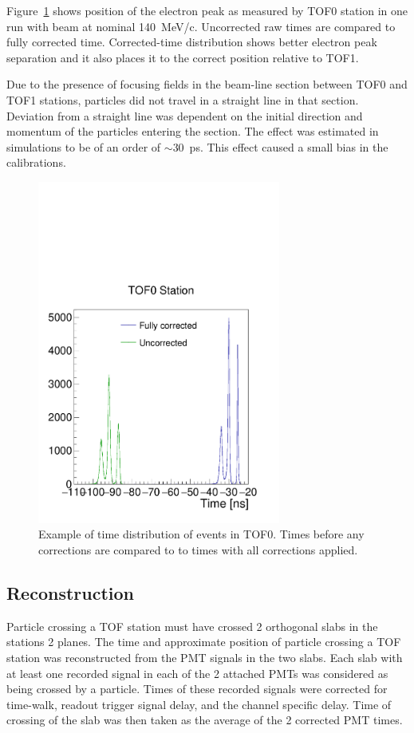 Figure~\ref{fig:tof0times} shows position of the electron peak as
measured by TOF0 station in one run with beam at nominal
140~MeV/c. Uncorrected raw times are compared to fully corrected
time. Corrected-time distribution shows better electron peak
separation and it also places it to the correct position relative to
TOF1.

Due to the presence of focusing fields in the beam-line section
between TOF0 and TOF1 stations, particles did not travel in a straight
line in that section. Deviation from a straight line was dependent on
the initial direction and momentum of the particles entering the
section. The effect was estimated  in
simulations to be of an order of $\sim$30~ps. This effect caused a
small bias in the calibrations.

\begin{figure}[!ht]
  \centering
  \includegraphics[width=8cm]{04_tof0_corrected_vs_uncorrected}
  \caption{Example of time distribution of events in TOF0. Times
    before any corrections are compared to to times with all
    corrections applied.}
  \label{fig:tof0times}
\end{figure}

\subsection{Reconstruction}

Particle crossing a TOF station must have crossed 2 orthogonal slabs
in the stations 2 planes.  The time and approximate position of
particle crossing a TOF station was reconstructed from the PMT signals
in the two slabs. Each slab with at least one recorded signal in each
of the 2 attached PMTs was considered as being crossed by a
particle. Times of these recorded signals were corrected for
time-walk, readout trigger signal delay, and the channel specific
delay. Time of crossing of the slab was then taken as the average of
the 2 corrected PMT times.

